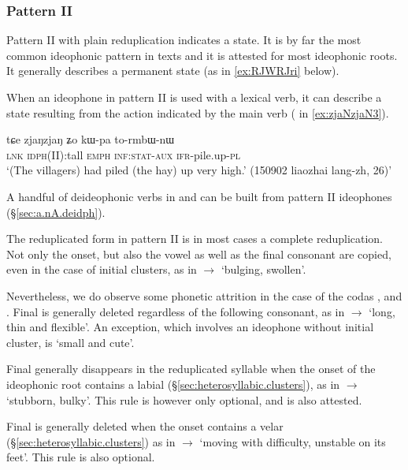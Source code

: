 \subsubsection{Pattern II} \label{sec:ideo.II}
Pattern II with plain reduplication indicates a state. It is by far the most common ideophonic pattern in texts and it is attested for most ideophonic roots.  It generally describes  a permanent state (as in \ref{ex:RJWRJri} below).

When an ideophone in pattern II is used with a lexical verb, it can describe a state resulting from the action indicated by the main verb ( in \ref{ex:zjaNzjaN3}).

  \begin{exe} 
\ex  \label{ex:zjaNzjaN3}
\gll  tɕe zjaŋzjaŋ ʑo kɯ-pa to-rmbɯ-nɯ \\
\textsc{lnk} \textsc{idph}(II):tall \textsc{emph} \textsc{inf}:\textsc{stat}-\textsc{aux} \textsc{ifr}-pile.up-\textsc{pl} \\
 \glt `(The villagers) had piled (the hay) up very high.' (150902 liaozhai lang-zh, 26)'
  \end{exe}
  
A handful of deideophonic verbs in  and  can be built from pattern II ideophones (§\ref{sec:a.nA.deidph}).
 
 The reduplicated form in pattern II is in most cases a complete reduplication. Not only the onset, but also the vowel as well as the final consonant are copied, even in the case of initial clusters, as in  $\rightarrow$  `bulging, swollen'. 

Nevertheless, we do observe some phonetic attrition in the case of  the codas ,  and . Final  is generally deleted regardless of the following consonant, as in   $\rightarrow$  `long, thin and flexible'. An exception, which involves an ideophone without initial cluster, is  `small and cute'.

Final  generally disappears in the reduplicated syllable when the onset of the ideophonic root contains a labial (§\ref{sec:heterosyllabic.clusters}), as in  $\rightarrow$   `stubborn, bulky'. This rule is however only optional, and  is also attested.

Final  is generally deleted when the onset contains a velar (§\ref{sec:heterosyllabic.clusters}) as in  $\rightarrow$  `moving with difficulty, unstable on its feet'. This rule is also optional.

